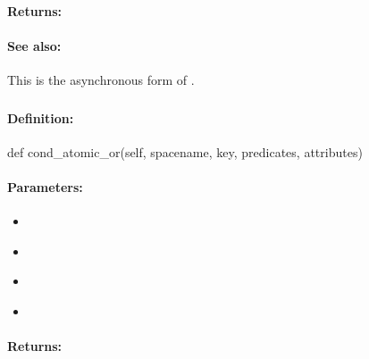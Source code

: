 \paragraph{Returns:}


\paragraph{See also:}  This is the asynchronous form of .

\pagebreak
\subsubsection{}
\label{api:python:cond_atomic_or}


\paragraph{Definition:}
\begin{pythoncode}
def cond_atomic_or(self, spacename, key, predicates, attributes)
\end{pythoncode}

\paragraph{Parameters:}
\begin{itemize}[noitemsep]
\item {}\\

\item {}\\

\item {}\\

\item {}\\

\end{itemize}

\paragraph{Returns:}


